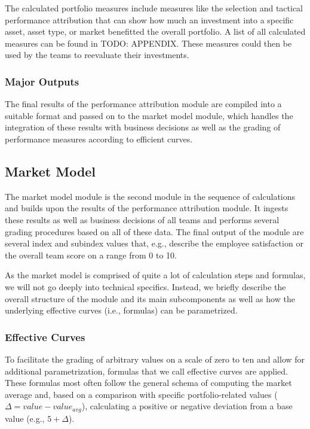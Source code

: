 The calculated portfolio measures include measures like the selection and tactical performance attribution that can show how much an investment into a specific asset, asset type, or market benefitted the overall portfolio. A list of all calculated measures can be found in TODO: APPENDIX. These measures could then be used by the teams to reevaluate their investments.

\subsubsection{Major Outputs}
The final results of the performance attribution module are compiled into a suitable format and passed on to the market model module, which handles the integration of these results with business decisions as well as the grading of performance measures according to efficient curves.


\subsection{Market Model}
The market model module is the second module in the sequence of calculations and builds upon the results of the performance attribution module. It ingests these results as well as business decisions of all teams and performs several grading procedures based on all of these data. The final output of the module are several index and subindex values that, e.g., describe the employee satisfaction or the overall team score on a range from 0 to 10.

As the market model is comprised of quite a lot of calculation steps and formulas, we will not go deeply into technical specifics. Instead, we briefly describe the overall structure of the module and its main subcomponents as well as how the underlying effective curves (i.e., formulas) can be parametrized.

\subsubsection{Effective Curves}
To facilitate the grading of arbitrary values on a scale of zero to ten and allow for additional parametrization, formulas that we call effective curves are applied. These formulas most often follow the general schema of computing the market average and, based on a comparison with specific portfolio-related values (\(\Delta = value - value_{avg}\)), calculating a positive or negative deviation from a base value (e.g., \(5 + \Delta \)).

